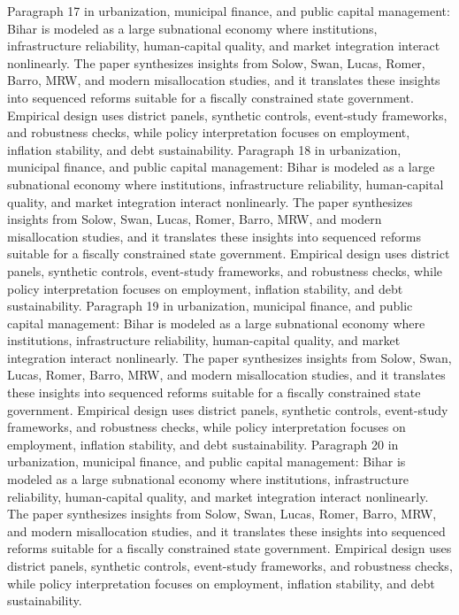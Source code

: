 \documentclass[preprint,12pt]{elsarticle}
\begin{document}
Paragraph 17 in urbanization, municipal finance, and public capital management: Bihar is modeled as a large subnational economy where institutions, infrastructure reliability, human-capital quality, and market integration interact nonlinearly. The paper synthesizes insights from Solow, Swan, Lucas, Romer, Barro, MRW, and modern misallocation studies, and it translates these insights into sequenced reforms suitable for a fiscally constrained state government. Empirical design uses district panels, synthetic controls, event-study frameworks, and robustness checks, while policy interpretation focuses on employment, inflation stability, and debt sustainability.
Paragraph 18 in urbanization, municipal finance, and public capital management: Bihar is modeled as a large subnational economy where institutions, infrastructure reliability, human-capital quality, and market integration interact nonlinearly. The paper synthesizes insights from Solow, Swan, Lucas, Romer, Barro, MRW, and modern misallocation studies, and it translates these insights into sequenced reforms suitable for a fiscally constrained state government. Empirical design uses district panels, synthetic controls, event-study frameworks, and robustness checks, while policy interpretation focuses on employment, inflation stability, and debt sustainability.
Paragraph 19 in urbanization, municipal finance, and public capital management: Bihar is modeled as a large subnational economy where institutions, infrastructure reliability, human-capital quality, and market integration interact nonlinearly. The paper synthesizes insights from Solow, Swan, Lucas, Romer, Barro, MRW, and modern misallocation studies, and it translates these insights into sequenced reforms suitable for a fiscally constrained state government. Empirical design uses district panels, synthetic controls, event-study frameworks, and robustness checks, while policy interpretation focuses on employment, inflation stability, and debt sustainability.
Paragraph 20 in urbanization, municipal finance, and public capital management: Bihar is modeled as a large subnational economy where institutions, infrastructure reliability, human-capital quality, and market integration interact nonlinearly. The paper synthesizes insights from Solow, Swan, Lucas, Romer, Barro, MRW, and modern misallocation studies, and it translates these insights into sequenced reforms suitable for a fiscally constrained state government. Empirical design uses district panels, synthetic controls, event-study frameworks, and robustness checks, while policy interpretation focuses on employment, inflation stability, and debt sustainability.
\end{document}
